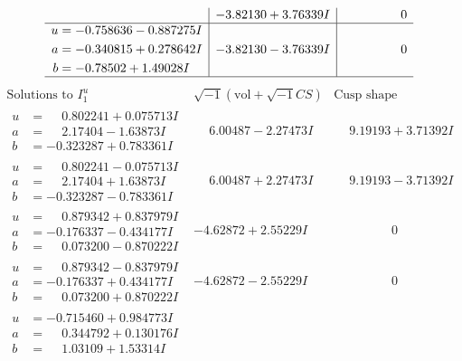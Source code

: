 \documentclass[1p]{elsarticle_modified}
\theoremstyle{definition}
\newcommand{\I}{\sqrt{-1}}
\begin{document}
$$\begin{array}{c|c|c}
 & -3.82130 + 3.76339 I & \phantom{-0.000000 } 0 \\ \hline\begin{aligned}
u &= -0.758636 - 0.887275 I \\
a &= -0.340815 + 0.278642 I \\
b &= -0.78502 + 1.49028 I\end{aligned}
 & -3.82130 - 3.76339 I & \phantom{-0.000000 } 0\\
 \hline 
 \end{array}$$\newpage$$\begin{array}{c|c|c}  
\text{Solutions to }I^u_{1}& \I (\text{vol} + \sqrt{-1}CS) & \text{Cusp shape}\\
 \hline 
\begin{aligned}
u &= \phantom{-}0.802241 + 0.075713 I \\
a &= \phantom{-}2.17404 - 1.63873 I \\
b &= -0.323287 + 0.783361 I\end{aligned}
 & \phantom{-}6.00487 - 2.27473 I & \phantom{-}9.19193 + 3.71392 I \\ \hline\begin{aligned}
u &= \phantom{-}0.802241 - 0.075713 I \\
a &= \phantom{-}2.17404 + 1.63873 I \\
b &= -0.323287 - 0.783361 I\end{aligned}
 & \phantom{-}6.00487 + 2.27473 I & \phantom{-}9.19193 - 3.71392 I \\ \hline\begin{aligned}
u &= \phantom{-}0.879342 + 0.837979 I \\
a &= -0.176337 - 0.434177 I \\
b &= \phantom{-}0.073200 - 0.870222 I\end{aligned}
 & -4.62872 + 2.55229 I & \phantom{-0.000000 } 0 \\ \hline\begin{aligned}
u &= \phantom{-}0.879342 - 0.837979 I \\
a &= -0.176337 + 0.434177 I \\
b &= \phantom{-}0.073200 + 0.870222 I\end{aligned}
 & -4.62872 - 2.55229 I & \phantom{-0.000000 } 0 \\ \hline\begin{aligned}
u &= -0.715460 + 0.984773 I \\
a &= \phantom{-}0.344792 + 0.130176 I \\
b &= \phantom{-}1.03109 + 1.53314 I\end{aligned}

\end{array}$$
\end{document}
